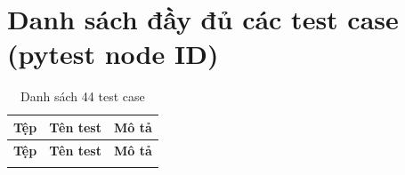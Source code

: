 \documentclass[12pt,a4paper]{article}
\begin{document}
\appendix
\section{Danh sách đầy đủ các test case (pytest node ID)}
{\footnotesize
\begin{longtable}{@{}p{3.6cm}p{6.8cm}p{4.2cm}@{}}
  \caption{Danh sách 44 test case}\label{tab:appendix}\\
  \toprule
  \textbf{Tệp} & \textbf{Tên test} & \textbf{Mô tả}\\
  \midrule
  \endfirsthead
  \toprule
  \textbf{Tệp} & \textbf{Tên test} & \textbf{Mô tả}\\
  \midrule
  \endhead
  \bottomrule
  \endfoot


\end{longtable}}
\end{document}
